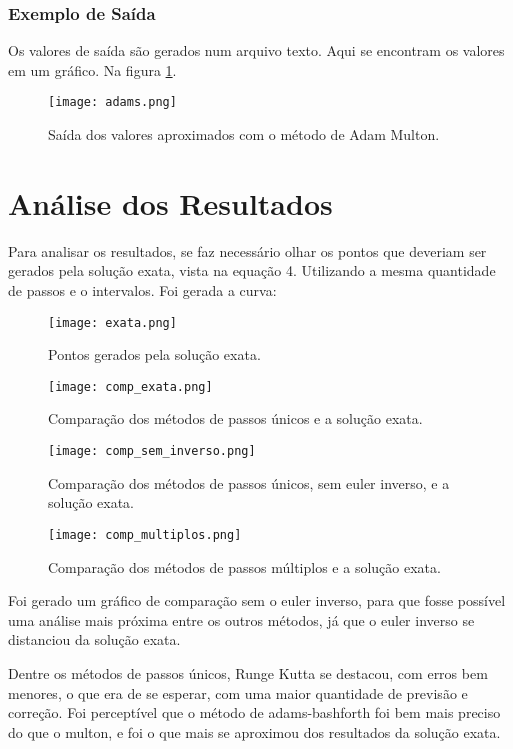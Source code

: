 \documentclass[a4paper]{article}
\begin{document}
\subsubsection{Exemplo de Saída}
Os valores de saída são gerados num arquivo texto. Aqui se encontram os valores em um gráfico. Na figura \ref{fig:adam_multon}.
\begin{figure}[H]
\centering
\texttt{[image: adams.png]}
\caption{\label{fig:adam_multon}Saída dos valores aproximados com o método de Adam Multon.}
\end{figure}




\newpage
\section{Análise dos Resultados}

Para analisar os resultados, se faz necessário olhar os pontos que deveriam ser gerados pela solução exata, vista na equação 4. Utilizando a mesma quantidade de passos e o intervalos. Foi gerada a curva:

\begin{figure}[H]
\centering
\texttt{[image: exata.png]}
\caption{\label{fig:exata}Pontos gerados pela solução exata.}
\end{figure}

\begin{figure}[H]
\centering
\texttt{[image: comp\_exata.png]}
\caption{\label{fig:com-u}Comparação dos métodos de passos únicos e a solução exata.}
\end{figure}

\begin{figure}[H]
\centering
\texttt{[image: comp\_sem\_inverso.png]}
\caption{\label{fig:com-s-u}Comparação dos métodos de passos únicos, sem euler inverso, e a solução exata.}
\end{figure}

\begin{figure}[H]
\centering
\texttt{[image: comp\_multiplos.png]}
\caption{\label{fig:com-m}Comparação dos métodos de passos múltiplos e a solução exata.}
\end{figure}

Foi gerado um gráfico de comparação sem o euler inverso, para que fosse possível uma análise mais próxima entre os outros métodos, já que o euler inverso se distanciou da solução exata. \par
Dentre os métodos de passos únicos, Runge Kutta se destacou, com erros bem menores, o que era de se esperar, com uma maior quantidade de previsão e correção.
Foi perceptível que o método de adams-bashforth foi bem mais preciso do que o multon, e foi o que mais se aproximou dos resultados da solução exata.
\end{document}
